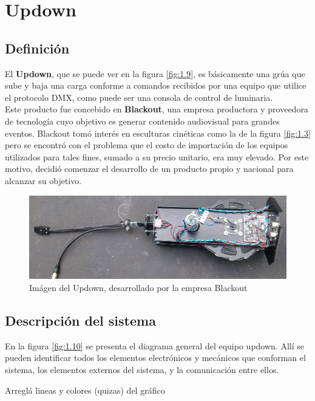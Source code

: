 \section{Updown}
\subsection{Definición}
El \textbf{Updown}, que se puede ver en la figura \ref{fig:1.9}, es básicamente una grúa que sube y baja una carga conforme a comandos recibidos por una equipo que utilice el protocolo DMX, como puede ser una consola de control de luminaria.\\

Este producto fue concebido en \textbf{Blackout}, una empresa productora y proveedora de tecnología cuyo objetivo es generar contenido audiovisual para grandes eventos. Blackout tomó interés en esculturas cinéticas como la de la figura \ref{fig:1.3} pero se encontró con el problema que el costo de importación de los equipos utilizados para tales fines, sumado a su precio unitario, era muy elevado. Por este motivo, decidió comenzar el desarrollo de un producto propio y nacional para alcanzar su objetivo.\\

\begin{figure}[!ht]
	\centering
	\includegraphics[width=15cm,scale=1]{resources/1_9-updown.jpg}
	\caption{Imágen del Updown, desarrollado por la empresa Blackout}
	\label{fig:\thefigure}
\end{figure}
\newpage
\subsection{Descripción del sistema}

En la figura \ref{fig:1.10} se presenta el diagrama general del equipo updown. Allí se pueden identificar todos los elementos electrónicos y mecánicos que conforman el sistema, los elementos externos del sistema, y la comunicación entre ellos.

\textcolor{FIXME}{Arreglá lineas y colores (quizas) del gráfico}

